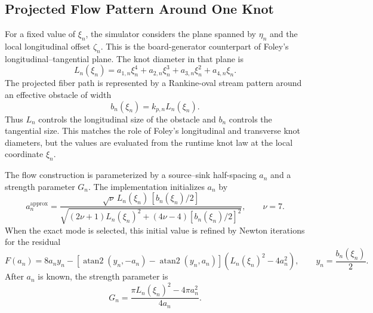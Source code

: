 \documentclass[11pt]{article}
\begin{document}
\subsection{Projected Flow Pattern Around One Knot}

For a fixed value of $\xi_n$, the simulator considers the plane spanned by $\eta_n$ and the local longitudinal
offset $\zeta_n$. This is the board-generator counterpart of Foley's longitudinal--tangential plane. The knot
diameter in that plane is
\begin{equation}
L_n(\xi_n)
=
a_{1,n}\xi_n^4+a_{2,n}\xi_n^3+a_{3,n}\xi_n^2+a_{4,n}\xi_n.
\end{equation}
The projected fiber path is represented by a Rankine-oval stream pattern around an effective obstacle of
width
\begin{equation}
b_n(\xi_n)=k_{p,n}L_n(\xi_n).
\end{equation}
Thus $L_n$ controls the longitudinal size of the obstacle and $b_n$ controls the tangential size. This matches
the role of Foley's longitudinal and transverse knot diameters, but the values are evaluated from the
runtime knot law at the local coordinate $\xi_n$.

The flow construction is parameterized by a source--sink half-spacing $a_n$ and a strength parameter $G_n$.
The implementation initializes $a_n$ by
\begin{equation}
a_n^{\mathrm{approx}}
=
\frac{\sqrt{\nu}\,L_n(\xi_n)\,[b_n(\xi_n)/2]}
{\sqrt{(2\nu+1)L_n(\xi_n)^2 + (4\nu-4)[b_n(\xi_n)/2]^2}},
\qquad
\nu=7.
\end{equation}
When the exact mode is selected, this initial value is refined by Newton iterations for the residual
\begin{equation}
F(a_n)
=
8a_n y_n
-
\left[
\operatorname{atan2}(y_n,-a_n)-\operatorname{atan2}(y_n,a_n)
\right]
\left(L_n(\xi_n)^2-4a_n^2\right),
\qquad
y_n=\frac{b_n(\xi_n)}{2}.
\end{equation}
After $a_n$ is known, the strength parameter is
\begin{equation}
G_n
=
\frac{\pi L_n(\xi_n)^2 - 4\pi a_n^2}{4a_n}.
\end{equation}
\end{document}
